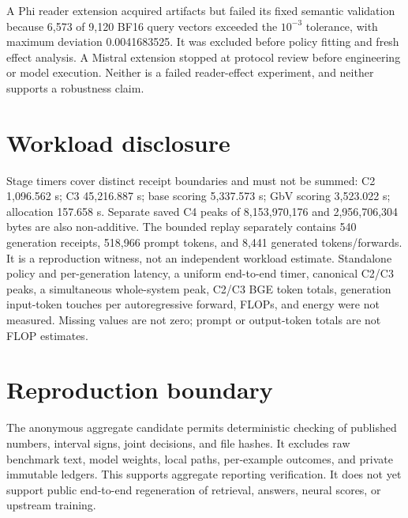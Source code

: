 \documentclass[10pt]{article}
\begin{document}
A Phi reader extension acquired artifacts but failed its fixed semantic validation because 6,573 of 9,120 BF16 query vectors exceeded the $10^{-3}$ tolerance, with maximum deviation 0.0041683525. It was excluded before policy fitting and fresh effect analysis. A Mistral extension stopped at protocol review before engineering or model execution. Neither is a failed reader-effect experiment, and neither supports a robustness claim.

\section{Workload disclosure}
Stage timers cover distinct receipt boundaries and must not be summed: C2 1,096.562 s; C3 45,216.887 s; base scoring 5,337.573 s; GbV scoring 3,523.022 s; allocation 157.658 s. Separate saved C4 peaks of 8,153,970,176 and 2,956,706,304 bytes are also non-additive. The bounded replay separately contains 540 generation receipts, 518,966 prompt tokens, and 8,441 generated tokens/forwards. It is a reproduction witness, not an independent workload estimate. Standalone policy and per-generation latency, a uniform end-to-end timer, canonical C2/C3 peaks, a simultaneous whole-system peak, C2/C3 BGE token totals, generation input-token touches per autoregressive forward, FLOPs, and energy were not measured. Missing values are not zero; prompt or output-token totals are not FLOP estimates.

\section{Reproduction boundary}
The anonymous aggregate candidate permits deterministic checking of published numbers, interval signs, joint decisions, and file hashes. It excludes raw benchmark text, model weights, local paths, per-example outcomes, and private immutable ledgers. This supports aggregate reporting verification. It does not yet support public end-to-end regeneration of retrieval, answers, neural scores, or upstream training.
\end{document}
